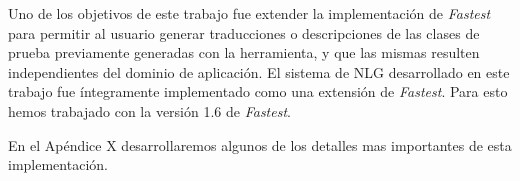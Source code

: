 Uno de los objetivos de este trabajo fue extender la implementación de \emph{Fastest} para permitir al usuario generar traducciones o descripciones de las clases de prueba previamente generadas con la herramienta, y que las mismas resulten independientes del dominio de aplicación.
El sistema de NLG desarrollado en este trabajo fue íntegramente implementado como una extensión de \emph{Fastest}. Para esto hemos trabajado con la versión 1.6 de \emph{Fastest}.

En el Apéndice X desarrollaremos algunos de los detalles mas importantes de esta implementación.